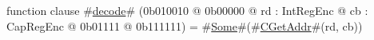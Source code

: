 function clause #\hyperref[zdecode]{decode}# (0b010010 @ 0b00000 @ rd : IntRegEnc @ cb : CapRegEnc @   0b01111 @ 0b111111) = #\hyperref[zSome]{Some}#(#\hyperref[zCGetAddr]{CGetAddr}#(rd, cb))
